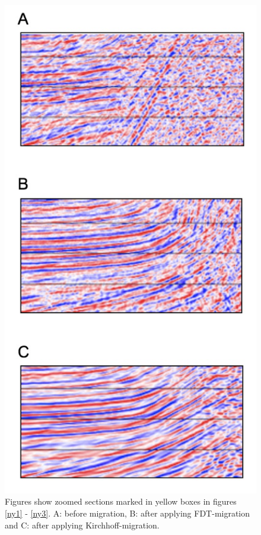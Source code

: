 \documentclass[10pt,a4paper]{article}
\begin{document}
\begin{figure}[H]
\includegraphics[scale=0.4]{ny6.jpg}
\caption{Figures show zoomed sections marked in yellow boxes in figures \ref{ny1} - \ref{ny3}. A: before migration, B: after applying FDT-migration and C: after applying Kirchhoff-migration. }
\label{ny6}
\end{figure}
\end{document}
